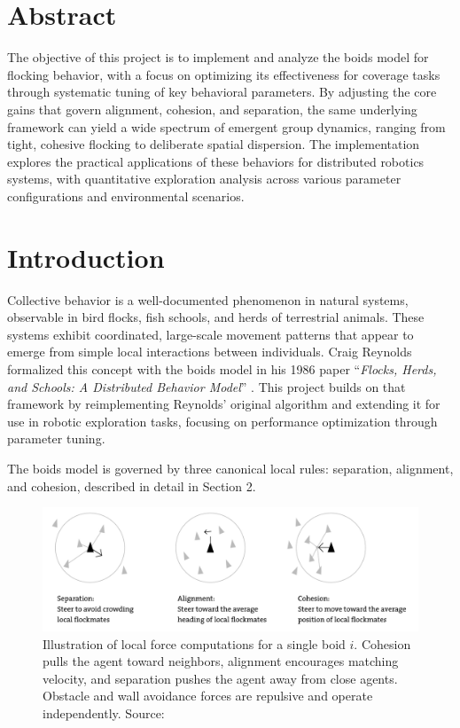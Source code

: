 \documentclass[12pt]{article}
\begin{document}
\setlength{\parindent}{0pt}
\setlength{\parskip}{0.25em}
\section*{Abstract}

The objective of this project is to implement and analyze the boids model for flocking behavior, with a focus on optimizing its effectiveness for coverage tasks through systematic tuning of key behavioral parameters. By adjusting the core gains that govern alignment, cohesion, and separation, the same underlying framework can yield a wide spectrum of emergent group dynamics, ranging from tight, cohesive flocking to deliberate spatial dispersion. The implementation explores the practical applications of these behaviors for distributed robotics systems, with quantitative exploration analysis across various parameter configurations and environmental scenarios.

\section{Introduction}

Collective behavior is a well-documented phenomenon in natural systems, observable in bird flocks, fish schools, and herds of terrestrial animals. These systems exhibit coordinated, large-scale movement patterns that appear to emerge from simple local interactions between individuals. Craig Reynolds formalized this concept with the boids model in his 1986 paper ``\emph{Flocks, Herds, and Schools: A Distributed Behavior Model}'' \cite{reynolds1987flocks}. This project builds on that framework by reimplementing Reynolds' original algorithm and extending it for use in robotic exploration tasks, focusing on performance optimization through parameter tuning.

The boids model is governed by three canonical local rules: separation, alignment, and cohesion, described in detail in Section 2.

\begin{figure}[h!]
    \centering
    \includegraphics[width=0.7\linewidth]{force_diagram.png}
    \caption{Illustration of local force computations for a single boid \(i\). Cohesion pulls the agent toward neighbors, alignment encourages matching velocity, and separation pushes the agent away from close agents. Obstacle and wall avoidance forces are repulsive and operate independently. Source: \cite{martinez2023boids}}
    \label{fig:force_diagram}
  \end{figure}
\end{document}
